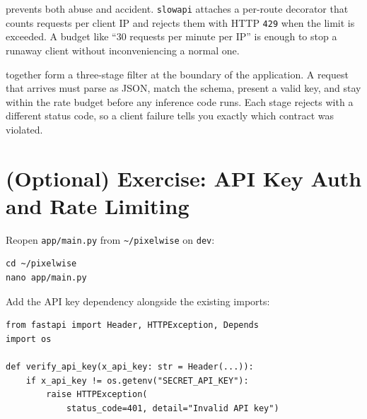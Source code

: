 
 prevents both abuse and accident.
\texttt{slowapi} attaches a per-route decorator that counts requests per
client IP and rejects them with HTTP \texttt{429} when the limit is
exceeded. A budget like ``30 requests per minute per IP'' is enough to
stop a runaway client without inconveniencing a normal one.


together form a three-stage filter at the boundary of the application.
A request that arrives must parse as JSON, match the schema, present a
valid key, and stay within the rate budget before any inference code runs.
Each stage rejects with a different status code, so a client failure tells
you exactly which contract was violated.



\newpage
\section{(Optional) Exercise: API Key Auth and Rate Limiting}

Reopen \texttt{app/main.py} from \texttt{\textasciitilde{}/pixelwise} on
\texttt{dev}:

\begin{verbatim}
cd ~/pixelwise
nano app/main.py
\end{verbatim}

Add the API key dependency alongside the existing imports:

\begin{verbatim}
from fastapi import Header, HTTPException, Depends
import os

def verify_api_key(x_api_key: str = Header(...)):
    if x_api_key != os.getenv("SECRET_API_KEY"):
        raise HTTPException(
            status_code=401, detail="Invalid API key")
\end{verbatim}

